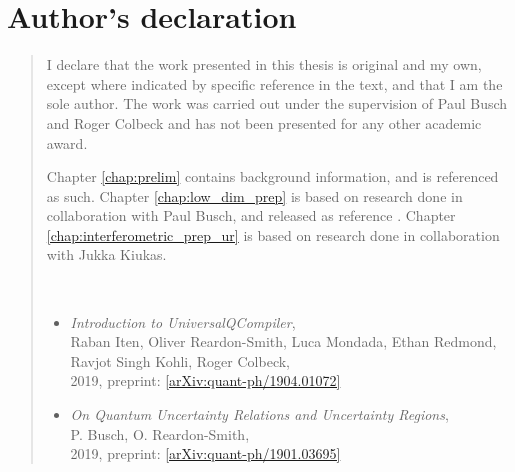 %
%
%
%
%
%
\chapter*{Author's declaration}
\begin{SingleSpace}
\begin{quote}

I declare that the work presented in this thesis is original and my own, except where indicated by specific reference in the text, and that I am the sole author. The work was carried out under the supervision of Paul Busch and Roger Colbeck and has not been presented for any other academic award.

Chapter \ref{chap:prelim} contains background information, and is referenced as such. Chapter \ref{chap:low_dim_prep} is based on research done in collaboration with Paul Busch, and released as reference \cite{pb-ors-u-regions-u-relations}. Chapter \ref{chap:interferometric_prep_ur} is based on research done in collaboration with Jukka Kiukas.

\bigskip

\bigskip

\bigskip

\bigskip

\bigskip

\\

\begin{itemize}
\item {\em Introduction to UniversalQCompiler}, \\ Raban Iten, Oliver Reardon-Smith, Luca Mondada, Ethan Redmond, Ravjot Singh Kohli, Roger Colbeck, \\2019, preprint: \href{https://arxiv.org/abs/1904.01072}{[arXiv:quant-ph/1904.01072]}
\item {\em On Quantum Uncertainty Relations and Uncertainty Regions}, \\P. Busch, O. Reardon-Smith, \\2019, preprint: \href{https://arxiv.org/abs/1901.03695}{[arXiv:quant-ph/1901.03695]}
\end{itemize}


\end{quote}
\end{SingleSpace}
\clearpage